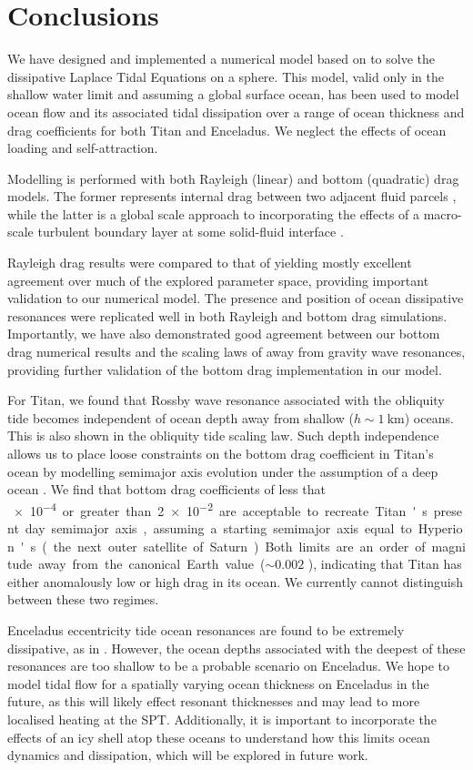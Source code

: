 \section{Conclusions}

We have designed and implemented a numerical model based on \citet{sears1995tidal} to solve the dissipative Laplace Tidal Equations on a sphere. This model, valid only in the shallow water limit and assuming a global surface ocean, has been used to model ocean flow and its associated tidal dissipation over a range of ocean thickness and drag coefficients for both Titan and Enceladus. We neglect the effects of ocean loading and self-attraction.

Modelling is performed with both Rayleigh (linear) and bottom (quadratic) drag models. The former represents internal drag between two adjacent fluid parcels \citep{neumann1968ocean}, while the latter is a global scale approach to incorporating the effects of a macro-scale turbulent boundary layer at some solid-fluid interface \citep{gill1982atmosphere}.

Rayleigh drag results were compared to that of \citet{matsuyama2014tidal} yielding mostly excellent agreement over much of the explored parameter space, providing important validation to our numerical model. The presence and position of ocean dissipative resonances were replicated well in both Rayleigh and bottom drag simulations. Importantly, we have also demonstrated good agreement between our bottom drag numerical results and the scaling laws of \citet{chen2013tidal} away from gravity wave resonances, providing further validation of the bottom drag implementation in our model.

For Titan, we found that Rossby wave resonance associated with the obliquity tide becomes independent of ocean depth away from shallow ($h \sim\SI{1}{\kilo\metre}$) oceans. This is also shown in the \citet{chen2013tidal} obliquity tide scaling law. Such depth independence allows us to place loose constraints on the bottom drag coefficient in Titan's ocean by modelling semimajor axis evolution under the assumption of a deep ocean \citep{sohl2003interior}. We find that bottom drag coefficients of less that \SI{e-4} or greater than \SI{2e-2} are acceptable to recreate Titan's present day semimajor axis, assuming a starting semimajor axis equal to Hyperion's (the next outer satellite of Saturn). Both limits are an order of magnitude away from the canonical Earth value ($\sim 0.002$ \citep{egbert2001estimates}), indicating that Titan has either anomalously low or high drag in its ocean. We currently cannot distinguish between these two regimes. 

Enceladus eccentricity tide ocean resonances are found to be extremely dissipative, as in \citet{tyler2011tidal, matsuyama2014tidal}. However, the ocean depths associated with the deepest of these resonances are too shallow to be a probable scenario on Enceladus. We hope to model tidal flow for a spatially varying ocean thickness on Enceladus in the future, as this will likely effect resonant thicknesses and may lead to more localised heating at the SPT. Additionally, it is important to incorporate the effects of an icy shell atop these oceans to understand how this limits ocean dynamics and dissipation, which will be explored in future work. 